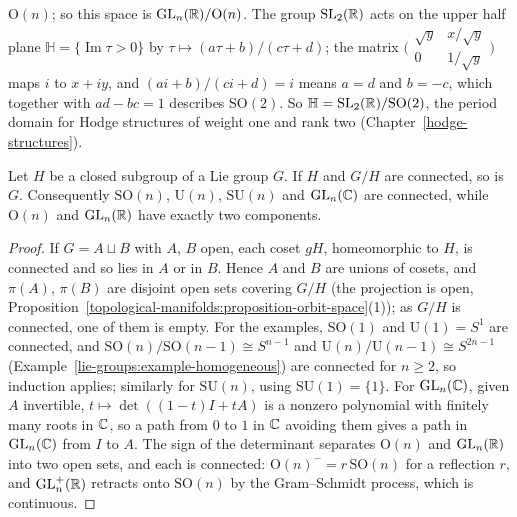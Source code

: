 \begin{example}
\begin{enumerate}
$\mathrm{O}(n)$; so this space is $\mathrm{GL}_n(\mathbb{R})/\mathrm{O}(n)$. The group $\mathrm{SL}_2(\mathbb{R})$ acts on the upper half plane $\mathbb{H} = \{\operatorname{Im}\tau > 0\}$
by $\tau \mapsto (a\tau + b)/(c\tau + d)$; the matrix $\bigl(\begin{smallmatrix}\sqrt{y} & x/\sqrt{y}\\ 0 & 1/\sqrt{y}\end{smallmatrix}\bigr)$ maps $i$ to
$x + iy$, and $(ai + b)/(ci + d) = i$ means $a = d$ and $b = -c$, which together with $ad - bc = 1$ describes $\mathrm{SO}(2)$. So
$\mathbb{H} = \mathrm{SL}_2(\mathbb{R})/\mathrm{SO}(2)$, the period domain for Hodge structures of weight one and rank two (Chapter~\ref{hodge-structures}).
\end{enumerate}
\end{example}

\begin{proposition}\label{lie-groups:proposition-connectedness}
Let $H$ be a closed subgroup of a Lie group $G$. If $H$ and $G/H$ are connected, so is $G$. Consequently $\mathrm{SO}(n)$, $\mathrm{U}(n)$, $\mathrm{SU}(n)$ and $\mathrm{GL}_n(\mathbb{C})$ are connected, while $\mathrm{O}(n)$ and $\mathrm{GL}_n(\mathbb{R})$ have
exactly two components.
\end{proposition}

\begin{proof}
If $G = A \sqcup B$ with $A$, $B$ open, each coset $gH$, homeomorphic to $H$, is connected and so lies in $A$ or in $B$. Hence $A$ and $B$ are unions of cosets, and $\pi(A)$, $\pi(B)$ are disjoint open sets covering $G/H$ (the projection is open,
Proposition~\ref{topological-manifolds:proposition-orbit-space}(1)); as $G/H$ is connected, one of them is empty. For the examples, $\mathrm{SO}(1)$ and $\mathrm{U}(1) = S^1$ are connected, and
$\mathrm{SO}(n)/\mathrm{SO}(n-1) \cong S^{n-1}$ and $\mathrm{U}(n)/\mathrm{U}(n-1) \cong S^{2n-1}$ (Example~\ref{lie-groups:example-homogeneous}) are connected for $n \geq 2$, so induction applies; similarly for $\mathrm{SU}(n)$, using
$\mathrm{SU}(1) = \{1\}$. For $\mathrm{GL}_n(\mathbb{C})$, given $A$ invertible, $t \mapsto \det((1 - t)I + tA)$ is a nonzero polynomial with finitely many roots in $\mathbb{C}$, so a path from $0$ to $1$ in $\mathbb{C}$ avoiding them gives a path in $\mathrm{GL}_n(\mathbb{C})$ from $I$ to $A$.
The sign of the determinant separates $\mathrm{O}(n)$ and $\mathrm{GL}_n(\mathbb{R})$ into two open sets, and each is connected: $\mathrm{O}(n)^- = r\,\mathrm{SO}(n)$ for a reflection $r$, and $\mathrm{GL}^+_n(\mathbb{R})$ retracts onto $\mathrm{SO}(n)$ by the Gram--Schmidt process,
which is continuous.
\end{proof}

